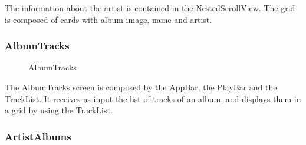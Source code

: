 \documentclass{article}
\begin{document}
The information about the artist is contained in the NestedScrollView. The grid
is composed of cards with album image, name and artist.

\subsubsection{AlbumTracks}

\begin{figure}[H]
	\noindent
	\caption{AlbumTracks} 
\end{figure}

The AlbumTracks screen is composed by the AppBar, the PlayBar and the TrackList.
It receives as input the list of tracks of an album, and displays them in a
grid by using the TrackList.

\subsubsection{ArtistAlbums}
\end{document}
